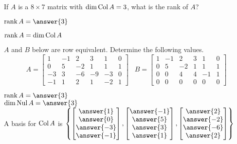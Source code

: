 \documentclass{ximera}
\def\Nul{\mathop{\rm Nul}}
\def\Col{\mathop{\rm Col}}
\def\dim{\mathop{\rm dim}}
\def\rank{\mathop{\rm rank}}
\begin{document}
  	  		               \begin{question} If $A$ is  a $8\times 7$ matrix with $\dim \Col A = 3$, what is the rank of $A$?
  	  		               	
  	  		               	$\rank A = \answer{3}$
  	  		               	
  	  		               	\vspace{10pt}
  	  		               	\begin{hint}
  	  		               		$\rank A = \dim \Col A$
  	  		               	\end{hint}
  	  		               \end{question}	
  	  		                 \begin{question} $A$ and $B$ below are row equivalent. Determine the following values.
  	  		                 	$$A = \begin{bmatrix} 1&-1& 2&3&1&0\\ 0&5&-2&1&1&1\\ -3&3&-6&-9&-3&0\\-1&1&2&1&-2&1\end{bmatrix} \hspace{10pt} B = \begin{bmatrix} 1&-1&2&3&1&0\\ 0&5&-2&1&1&1\\ 0&0&4&4&-1&1\\ 0&0&0&0&0&0\end{bmatrix}$$
  	  		                 	
  	  		                 $\rank A = \answer{3}$\\
  	  		                 $\dim \Nul A = \answer{3}$\\
  	  		                 
  	  		                 A basis for $\Col A$ is $\left\{ \begin{bmatrix} \answer{1}\\\answer{0}\\ \answer{-3}\\ \answer{-1}\end{bmatrix},    \begin{bmatrix} \answer{-1}\\\answer{5}\\ \answer{3}\\ \answer{1}\end{bmatrix}, \begin{bmatrix} \answer{2}\\\answer{-2}\\ \answer{-6}\\ \answer{2}\end{bmatrix}    \right\}$
  	  		              
  	  		                 \end{question}
  	  		    
  
\end{document}
